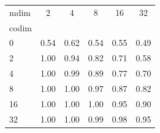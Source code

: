 \begin{tabular}{l|ccccc}
\toprule
mdim & 2 & \textcolor{blue!70!black}{4} & 8 & 16 & 32 \\
codim &  &  &  &  &  \\
\midrule
0 & 0.54 & \textcolor{blue!70!black}{0.62} & 0.54 & 0.55 & 0.49 \\
2 & 1.00 & \textcolor{blue!70!black}{0.94} & 0.82 & 0.71 & 0.58 \\
\textcolor{red!70!black}{4} & \textcolor{red!70!black}{1.00} & \textcolor{purple!70!black}{0.99} & \textcolor{red!70!black}{0.89} & \textcolor{red!70!black}{0.77} & \textcolor{red!70!black}{0.70} \\
8 & 1.00 & \textcolor{blue!70!black}{1.00} & 0.97 & 0.87 & 0.82 \\
16 & 1.00 & \textcolor{blue!70!black}{1.00} & 1.00 & 0.95 & 0.90 \\
32 & 1.00 & \textcolor{blue!70!black}{1.00} & 0.99 & 0.98 & 0.95 \\
\bottomrule
\end{tabular}
